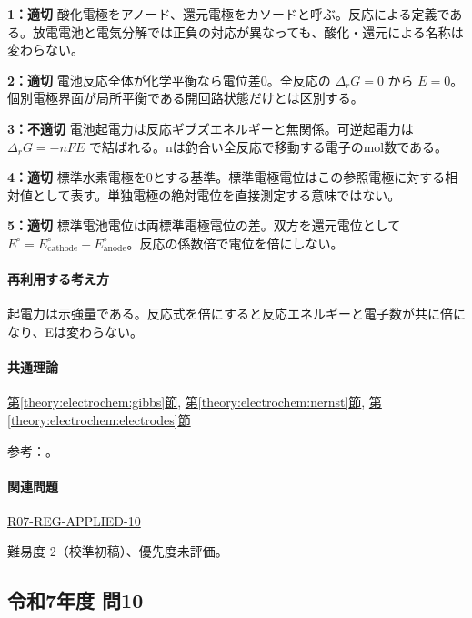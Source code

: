\noindent\textbf{1：適切} 酸化電極をアノード、還元電極をカソードと呼ぶ。反応による定義である。放電電池と電気分解では正負の対応が異なっても、酸化・還元による名称は変わらない。\par

\noindent\textbf{2：適切} 電池反応全体が化学平衡なら電位差0。全反応の \(\Delta_rG=0\) から \(E=0\)。個別電極界面が局所平衡である開回路状態だけとは区別する。\par

\noindent\textbf{3：不適切} 電池起電力は反応ギブズエネルギーと無関係。可逆起電力は \(\Delta_rG=-nFE\) で結ばれる。nは釣合い全反応で移動する電子のmol数である。\par

\noindent\textbf{4：適切} 標準水素電極を0とする基準。標準電極電位はこの参照電極に対する相対値として表す。単独電極の絶対電位を直接測定する意味ではない。\par

\noindent\textbf{5：適切} 標準電池電位は両標準電極電位の差。双方を還元電位として \(E^\circ=E^\circ_{\mathrm{cathode}}-E^\circ_{\mathrm{anode}}\)。反応の係数倍で電位を倍にしない。\par

\paragraph{再利用する考え方} 起電力は示強量である。反応式を倍にすると反応エネルギーと電子数が共に倍になり、Eは変わらない。

\paragraph{共通理論} \hyperref[theory:electrochem:gibbs]{第\ref*{theory:electrochem:gibbs}節}, \hyperref[theory:electrochem:nernst]{第\ref*{theory:electrochem:nernst}節}, \hyperref[theory:electrochem:electrodes]{第\ref*{theory:electrochem:electrodes}節}

\par 参考：\cite{openstax_cell_gibbs,mit_redox2014}。

\paragraph{関連問題} \hyperref[q:r07-reg-applied-10]{R07-REG-APPLIED-10}

\par 難易度 2（校準初稿）、優先度未評価。

\subsection{令和7年度 問10}
\label{q:r07-reg-applied-10}

